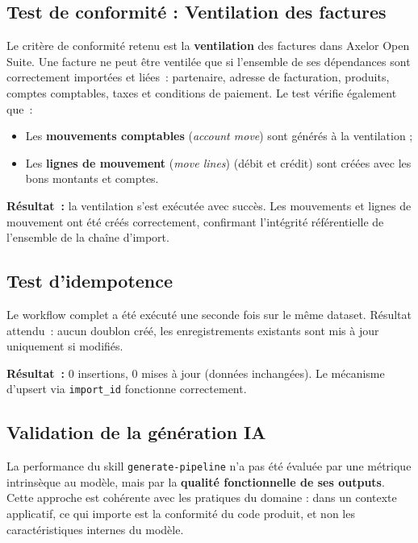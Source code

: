 \subsection{Test de conformité : Ventilation des factures}

Le critère de conformité retenu est la \textbf{ventilation} des factures dans Axelor Open Suite. Une facture ne peut être ventilée que si l'ensemble de ses dépendances sont correctement importées et liées~: partenaire, adresse de facturation, produits, comptes comptables, taxes et conditions de paiement. Le test vérifie également que~:

\begin{itemize}
    \item Les \textbf{mouvements comptables} (\emph{account move}) sont générés à la ventilation ;
    \item Les \textbf{lignes de mouvement} (\emph{move lines}) (débit et crédit) sont créées avec les bons montants et comptes.
\end{itemize}

\textbf{Résultat~:} la ventilation s'est exécutée avec succès. Les mouvements et lignes de mouvement ont été créés correctement, confirmant l'intégrité référentielle de l'ensemble de la chaîne d'import.

\subsection{Test d'idempotence}

Le workflow complet a été exécuté une seconde fois sur le même dataset. Résultat attendu~: aucun doublon créé, les enregistrements existants sont mis à jour uniquement si modifiés.

\textbf{Résultat~:} 0 insertions, 0 mises à jour (données inchangées). Le mécanisme d'upsert via \texttt{import\_id} fonctionne correctement.

\subsection{Validation de la génération IA}

La performance du skill \texttt{generate-pipeline} n'a pas été évaluée par une métrique intrinsèque au modèle, mais par la \textbf{qualité fonctionnelle de ses outputs}. Cette approche est cohérente avec les pratiques du domaine : dans un contexte applicatif, ce qui importe est la conformité du code produit, et non les caractéristiques internes du modèle.

